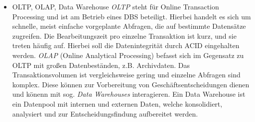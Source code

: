 \documentclass[a4paper,12pt]{article}
\begin{document}
\begin{itemize}
        \item OLTP, OLAP, Data Warehouse
        \newline \emph{OLTP} steht für Online Transaction Processing und ist am Betrieb eines DBS beteiligt.
        Hierbei handelt es sich um schnelle, meist einfache vorgeplante Abfragen, die auf bestimmte Datensätze zugreifen.
        Die Bearbeitungszeit pro einzelne Transaktion ist kurz, und sie treten häufig auf. Hierbei soll die
        Datenintegrität durch ACID eingehalten werden.
        \emph{OLAP} (Online Analytical Processing) befasst sich im Gegensatz zu OLTP mit großen Datenbeständen,
        z.B. Archivdaten. Das Transaktionsvolumen ist vergleichsweise gering und einzelne Abfragen sind komplex.
        Diese können zur Vorbereitung von Geschäftsentscheidungen dienen und könenn mit sog. \emph{Data Warehouses }
        interagieren. Ein Data Warehouse ist ein Datenpool mit internen und externen Daten, welche konsolidiert,
        analysiert und zur Entscheidungsfindung aufbereitet werden.

    \end{itemize}

    \newpage
\end{document}
